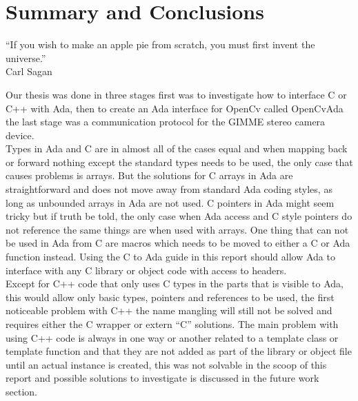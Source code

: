 \chapter{Summary and Conclusions}
\begin{flushright}
``If you wish to make an apple pie from scratch, you must first invent the universe.''
\\Carl Sagan
\end{flushright}
Our thesis was done in three stages first was to investigate how to interface C or C++ with Ada, then to create an Ada interface for OpenCv called OpenCvAda the last stage was a communication protocol for the GIMME stereo camera device.
\\
Types in Ada and C are in almost all of the cases equal and when mapping back or forward nothing except the standard types needs to be used, the only case that causes problems is arrays. But the solutions for C arrays in Ada are straightforward and does not move away from standard Ada coding styles, as long as unbounded arrays in Ada are not used. C pointers in Ada might seem tricky but if truth be told, the only case when Ada access and C style pointers do not reference the same things are when used with arrays. One thing that can not be used in Ada from C are macros which needs to be moved to either a C or Ada function instead. Using the C to Ada guide in this report should allow Ada to interface with any C library or object code with access to headers.
\\
Except for C++ code that only uses C types in the parts that is visible to Ada, this would allow only basic types, pointers and references to be used, the first noticeable problem with C++ the name mangling will still not be solved and requires either the C wrapper or extern ``C'' solutions. The main problem with using C++ code is always in one way or another related to a template class or template function and that they are not added as part of the library or object file until an actual instance is created, this was not solvable in the scoop of this report and possible solutions to investigate is discussed in the future work section.
\\

